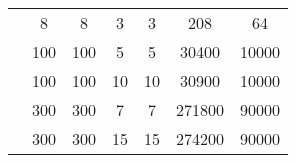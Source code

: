 \begin{adjustbox}{center}
\begin{tabular}{ |l||c|c||c|c||c|c|  }
		\cline{2-7}
		                                        & 8                                    & 8                                    & 3                             & 3                         & 208      & 64    \\
		\cline{2-7}
		                                        & 100                                  & 100                                  & 5                             & 5                         & 30400    & 10000 \\
		\cline{2-7}
		                                        & 100                                  & 100                                  & 10                            & 10                        & 30900    & 10000 \\
		\cline{2-7}
		                                        & 300                                  & 300                                  & 7                             & 7                         & 271800   & 90000 \\
		\cline{2-7}
		                                        & 300                                  & 300                                  & 15                            & 15                        & 274200   & 90000 \\
		\hline
	\end{tabular}
\end{adjustbox}
